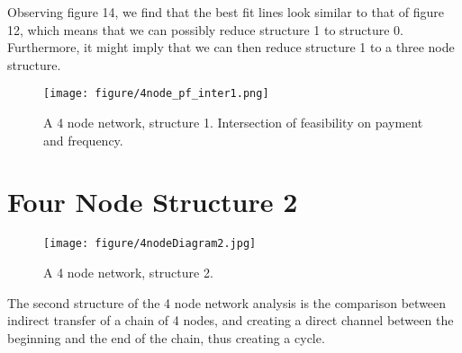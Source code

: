 \documentclass[twocolumn,10pt]{report}
\begin{document}
Observing figure 14, we find that the best fit lines look similar to that of figure 12, which means that we can possibly reduce structure 1 to structure 0. Furthermore, it might imply that we can then reduce structure 1 to a three node structure.  


\begin{figure}[t]
    \begin{center}
    \setlength{\unitlength}{0.012500in}%
    \texttt{[image: figure/4node\_pf\_inter1.png]}
    \end{center}
    \caption{A 4 node network, structure 1. Intersection of feasibility on payment and frequency.}
    \label{figure_4Node6} 
    \end{figure}






\section{Four Node Structure 2}
\begin{figure}[t]
    \begin{center}
    \setlength{\unitlength}{0.012500in}%
    \texttt{[image: figure/4nodeDiagram2.jpg]}
    \end{center}
    \caption{A 4 node network, structure 2.}
    \label{figure_4Node7} 
\end{figure}
The second structure of the 4 node network analysis is the comparison between indirect transfer of a chain of 4 nodes, and creating a direct channel between the beginning and the end of the chain, thus creating a cycle. 
\end{document}
